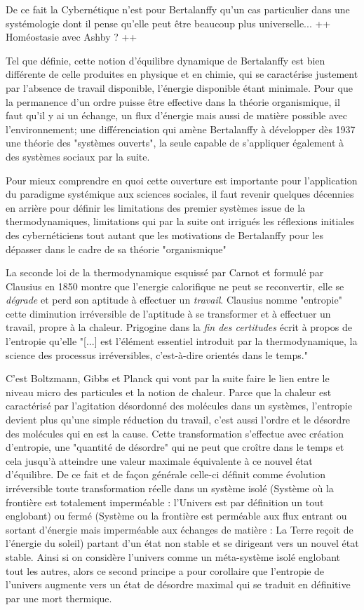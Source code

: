 {De ce fait la Cybernétique n'est pour Bertalanffy qu'un cas particulier dans une systémologie dont il pense qu'elle peut être beaucoup plus universelle... ++ Homéostasie avec Ashby ? ++

Tel que définie, cette notion d'équilibre dynamique de Bertalanffy est bien différente de celle produites en physique et en chimie, qui se caractérise justement par l'absence de travail disponible, l'énergie disponible étant minimale. Pour que la permanence d'un ordre puisse être effective dans la théorie organismique, il faut qu'il y ai un échange, un flux d'énergie mais aussi de matière possible avec l'environnement; une différenciation qui amène Bertalanffy à développer dès 1937 une théorie des "systèmes ouverts", la seule capable de s'appliquer également à des systèmes sociaux par la suite.

Pour mieux comprendre en quoi cette ouverture est importante pour l'application du paradigme systémique aux sciences sociales, il faut revenir quelques décennies en arrière pour définir les limitations des premier systèmes issue de la thermodynamiques, limitations qui par la suite ont irrigués les réflexions initiales des cybernéticiens tout autant que les motivations de Bertalanffy pour les dépasser dans le cadre de sa théorie "organismique"

La seconde loi de la thermodynamique esquissé par Carnot et formulé par Clausius en 1850 montre que l'energie calorifique ne peut se reconvertir, elle se \textit{dégrade} et perd son aptitude à effectuer un \textit{travail}. Clausius nomme "entropie" cette diminution irréversible de l'aptitude à se transformer et à effectuer un travail, propre à la chaleur.\autocite[35]{Morin1977} Prigogine dans la \textit{fin des certitudes} écrit à propos de l'entropie qu'elle "[...] est l’élément essentiel introduit par la thermodynamique, la science des processus irréversibles, c’est-à-dire orientés dans le temps." 

C'est Boltzmann, Gibbs et Planck qui vont par la suite faire le lien entre le niveau micro des particules et la notion de chaleur. Parce que la chaleur est caractérisé par l'agitation désordonné des molécules dans un systèmes, l'entropie devient plus qu'une simple réduction du travail, c'est aussi l'ordre et le désordre des molécules qui en est la cause. Cette transformation s'effectue avec création d'entropie, une "quantité de désordre" qui ne peut que croître dans le temps et cela jusqu'à atteindre une valeur maximale équivalente à ce nouvel état d'équilibre. De ce fait et de façon générale celle-ci définit comme évolution irréversible toute transformation réelle dans un système isolé (Système où la frontière est totalement imperméable : l'Univers est par définition un tout englobant) ou fermé (Système ou la frontière est perméable aux flux entrant ou sortant d'énergie mais imperméable aux échanges de matière : La Terre reçoit de l'énergie du soleil) partant d'un état non stable et se dirigeant vers un nouvel état stable.  Ainsi si on considère l'univers comme un méta-système isolé englobant tout les autres, alors ce second principe a pour corollaire que l'entropie de l'univers augmente vers un état de désordre maximal qui se traduit en définitive par une mort thermique.

}
